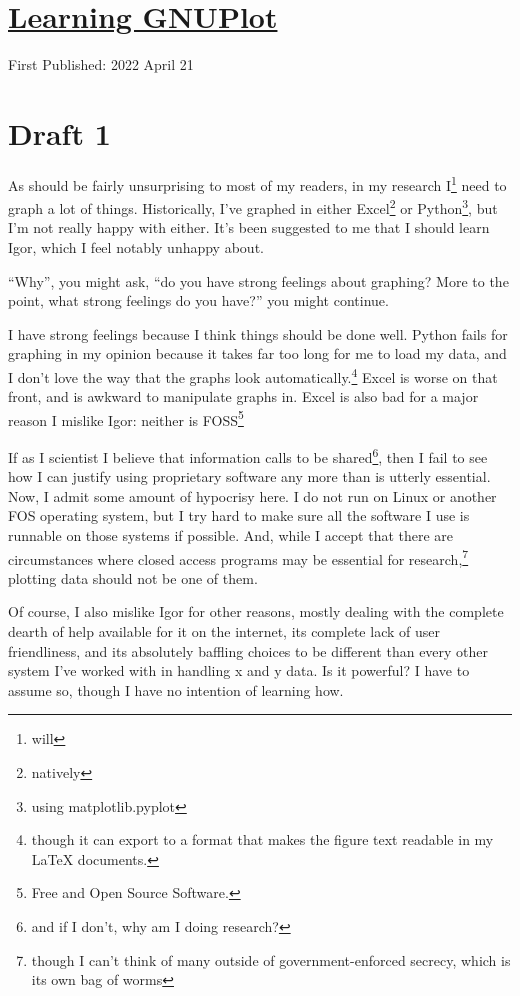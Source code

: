 \documentclass[12pt]{article}[titlepage]
\newcommand{\say}[1]{``#1''}
\newcommand{\1}{\={a}}
\newcommand{\2}{\={e}}
\newcommand{\3}{\={\i}}
\newcommand{\4}{\=o}
\newcommand{\5}{\=u}
\newcommand{\6}{\={A}}
\renewcommand{\,}{\textsuperscript{,}}
\begin{document}
\doublespacing
\section{\href{learning-gnuplot.html}{Learning GNUPlot}}
First Published: 2022 April 21


\section{Draft 1}
As should be fairly unsurprising to most of my readers, in my research I\footnote{will} need to graph a lot of things.
Historically, I've graphed in either Excel\footnote{natively} or Python\footnote{using matplotlib.pyplot}, but I'm not really happy with either.
It's been suggested to me that I should learn Igor, which I feel notably unhappy about.

\say{Why}, you might ask, \say{do you have strong feelings about graphing?
More to the point, what strong feelings do you have?}
you might continue.

I have strong feelings because I think things should be done well.
Python fails for graphing in my opinion because it takes far too long for me to load my data, and I don't love the way that the graphs look automatically.\footnote{though it can export to a format that makes the figure text readable in my LaTeX documents.}
Excel is worse on that front, and is awkward to manipulate graphs in.
Excel is also bad for a major reason I mislike Igor: neither is FOSS\footnote{Free and Open Source Software.}

If as I scientist I believe that information calls to be shared\footnote{and if I don't, why am I doing research?}, then I fail to see how I can justify using proprietary software any more than is utterly essential.
Now, I admit some amount of hypocrisy here.
I do not run on Linux or another FOS operating system, but I try hard to make sure all the software I use is runnable on those systems if possible.
And, while I accept that there are circumstances where closed access programs may be essential for research,\footnote{though I can't think of many outside of government-enforced secrecy, which is its own bag of worms} plotting data should not be one of them.

Of course, I also mislike Igor for other reasons, mostly dealing with the complete dearth of help available for it on the internet, its complete lack of user friendliness, and its absolutely baffling choices to be different than every other system I've worked with in handling x and y data.
Is it powerful?
I have to assume so, though I have no intention of learning how.
\end{document}
